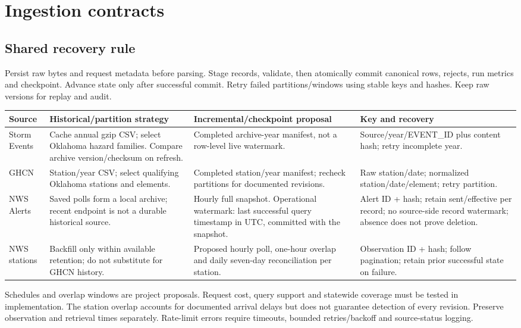 \FloatBarrier
\section{Ingestion contracts}
\subsection{Shared recovery rule}
Persist raw bytes and request metadata before parsing. Stage records, validate,
then atomically commit canonical rows, rejects, run metrics and checkpoint.
Advance state only after successful commit. Retry failed partitions/windows using
stable keys and hashes. Keep raw versions for replay and audit.

\begin{longtable}{L{2.1cm}L{4.4cm}L{4.4cm}L{4cm}}
\toprule Source & Historical/partition strategy & Incremental/checkpoint proposal & Key and recovery \\
\midrule\endhead
Storm Events & Cache annual gzip CSV; select Oklahoma hazard families. Compare archive version/checksum on refresh. & Completed archive-year manifest, not a row-level live watermark. & Source/year/EVENT\_ID plus content hash; retry incomplete year. \\
GHCN & Station/year CSV; select qualifying Oklahoma stations and elements. & Completed station/year manifest; recheck partitions for documented revisions. & Raw station/date; normalized station/date/element; retry partition. \\
NWS Alerts & Saved polls form a local archive; recent endpoint is not a durable historical source. & Hourly full snapshot. Operational watermark: last successful query timestamp in UTC, committed with the snapshot. & Alert ID + hash; retain sent/effective per record; no source-side record watermark; absence does not prove deletion. \\
NWS stations & Backfill only within available retention; do not substitute for GHCN history. & Proposed hourly poll, one-hour overlap and daily seven-day reconciliation per station. & Observation ID + hash; follow pagination; retain prior successful state on failure. \\
\bottomrule
\end{longtable}
Schedules and overlap windows are project proposals. Request cost, query support
and statewide coverage must be tested in implementation. The station overlap
accounts for documented arrival delays but does not guarantee detection of every
revision. Preserve observation and retrieval times separately. Rate-limit errors
require timeouts, bounded retries/backoff and source-status logging.

